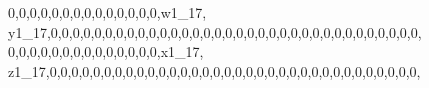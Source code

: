 \documentclass[]{article}
\newenvironment{Shaded}{\begin{snugshade}}{\end{snugshade}}
\newcommand{\DecValTok}[1]{\textcolor[rgb]{0.00,0.00,0.81}{#1}}
\newcommand{\NormalTok}[1]{#1}
\begin{document}
\begin{Shaded}
\begin{Highlighting}[]
\DecValTok{0}\NormalTok{,}\DecValTok{0}\NormalTok{,}\DecValTok{0}\NormalTok{,}\DecValTok{0}\NormalTok{,}\DecValTok{0}\NormalTok{,}\DecValTok{0}\NormalTok{,}\DecValTok{0}\NormalTok{,}\DecValTok{0}\NormalTok{,}\DecValTok{0}\NormalTok{,}\DecValTok{0}\NormalTok{,}\DecValTok{0}\NormalTok{,}\DecValTok{0}\NormalTok{,}\DecValTok{0}\NormalTok{,}\DecValTok{0}\NormalTok{,w1_}\DecValTok{17}\NormalTok{, y1_}\DecValTok{17}\NormalTok{,}\DecValTok{0}\NormalTok{,}\DecValTok{0}\NormalTok{,}\DecValTok{0}\NormalTok{,}\DecValTok{0}\NormalTok{,}\DecValTok{0}\NormalTok{,}\DecValTok{0}\NormalTok{,}\DecValTok{0}\NormalTok{,}\DecValTok{0}\NormalTok{,}\DecValTok{0}\NormalTok{,}\DecValTok{0}\NormalTok{,}\DecValTok{0}\NormalTok{,}\DecValTok{0}\NormalTok{,}\DecValTok{0}\NormalTok{,}\DecValTok{0}\NormalTok{,}\DecValTok{0}\NormalTok{,}\DecValTok{0}\NormalTok{,}\DecValTok{0}\NormalTok{,}\DecValTok{0}\NormalTok{,}\DecValTok{0}\NormalTok{,}\DecValTok{0}\NormalTok{,}\DecValTok{0}\NormalTok{,}\DecValTok{0}\NormalTok{,}\DecValTok{0}\NormalTok{,}\DecValTok{0}\NormalTok{,}\DecValTok{0}\NormalTok{,}\DecValTok{0}\NormalTok{,}\DecValTok{0}\NormalTok{,}\DecValTok{0}\NormalTok{,}\DecValTok{0}\NormalTok{,}\DecValTok{0}\NormalTok{,}\DecValTok{0}\NormalTok{,}\DecValTok{0}\NormalTok{,}\DecValTok{0}\NormalTok{,}\DecValTok{0}\NormalTok{,}
\DecValTok{0}\NormalTok{,}\DecValTok{0}\NormalTok{,}\DecValTok{0}\NormalTok{,}\DecValTok{0}\NormalTok{,}\DecValTok{0}\NormalTok{,}\DecValTok{0}\NormalTok{,}\DecValTok{0}\NormalTok{,}\DecValTok{0}\NormalTok{,}\DecValTok{0}\NormalTok{,}\DecValTok{0}\NormalTok{,}\DecValTok{0}\NormalTok{,}\DecValTok{0}\NormalTok{,}\DecValTok{0}\NormalTok{,}\DecValTok{0}\NormalTok{,x1_}\DecValTok{17}\NormalTok{, z1_}\DecValTok{17}\NormalTok{,}\DecValTok{0}\NormalTok{,}\DecValTok{0}\NormalTok{,}\DecValTok{0}\NormalTok{,}\DecValTok{0}\NormalTok{,}\DecValTok{0}\NormalTok{,}\DecValTok{0}\NormalTok{,}\DecValTok{0}\NormalTok{,}\DecValTok{0}\NormalTok{,}\DecValTok{0}\NormalTok{,}\DecValTok{0}\NormalTok{,}\DecValTok{0}\NormalTok{,}\DecValTok{0}\NormalTok{,}\DecValTok{0}\NormalTok{,}\DecValTok{0}\NormalTok{,}\DecValTok{0}\NormalTok{,}\DecValTok{0}\NormalTok{,}\DecValTok{0}\NormalTok{,}\DecValTok{0}\NormalTok{,}\DecValTok{0}\NormalTok{,}\DecValTok{0}\NormalTok{,}\DecValTok{0}\NormalTok{,}\DecValTok{0}\NormalTok{,}\DecValTok{0}\NormalTok{,}\DecValTok{0}\NormalTok{,}\DecValTok{0}\NormalTok{,}\DecValTok{0}\NormalTok{,}\DecValTok{0}\NormalTok{,}\DecValTok{0}\NormalTok{,}\DecValTok{0}\NormalTok{,}\DecValTok{0}\NormalTok{,}\DecValTok{0}\NormalTok{,}\DecValTok{0}\NormalTok{,}\DecValTok{0}\NormalTok{,}\DecValTok{0}\NormalTok{,}

\end{Highlighting}
\end{Shaded}
\end{document}
